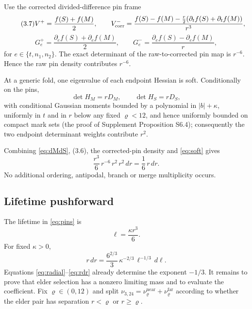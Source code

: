 Use the corrected divided-difference pin frame
\begin{equation}\tag{3.7}
V^+=\frac{f(S)+f(M)}2,\qquad V^-_{\rm corr}=\frac{f(S)-f(M)-\frac r2(\partial_tf(S)+\partial_tf(M))}{r^3},
\end{equation}
\begin{equation}\tag{3.8}
G_e^+=\frac{\partial_ef(S)+\partial_ef(M)}2,\qquad G_e^-=\frac{\partial_ef(S)-\partial_ef(M)}r,
\end{equation}
for $e\in\{t,n_1,n_2\}$. The exact determinant of the raw-to-corrected pin map is $r^{-6}$. Hence the raw pin density contributes $r^{-6}$.

At a generic fold, one eigenvalue of each endpoint Hessian is soft. Conditionally on the pins,
\begin{equation}\tag{3.9}\label{eq:soft}
\det H_M=rD_M,\qquad \det H_S=rD_S,
\end{equation}
with conditional Gaussian moments bounded by a polynomial in $|b|+\kappa$, uniformly in $t$ and in $r$ below any fixed $\varrho<12$, and hence uniformly bounded on compact mark sets (the proof of Supplement Proposition S6.4); consequently the two endpoint determinant weights contribute $r^2$.

Combining \eqref{eq:dMdS}, (3.6), the corrected-pin density and \eqref{eq:soft} gives
\begin{equation}\tag{3.10}\label{eq:radial}
\frac{r^3}{6}\,r^{-6}\,r^2\,r^2\,dr=\frac16\,r\,dr .
\end{equation}
No additional ordering, antipodal, branch or merge multiplicity occurs.

\subsection{Lifetime pushforward}\label{ssec:pushforward}

The lifetime in \eqref{eq:pins} is
\begin{equation}\tag{3.11}
\ell=\frac{\kappa r^3}{6}.
\end{equation}
For fixed $\kappa>0$,
\begin{equation}\tag{3.12}\label{eq:rdr}
r\,dr=\frac{6^{2/3}}{3}\,\kappa^{-2/3}\,\ell^{-1/3}\,d\ell .
\end{equation}
Equations \eqref{eq:radial}--\eqref{eq:rdr} already determine the exponent $-1/3$. It remains to prove that elder selection has a nonzero limiting mass and to evaluate the coefficient. Fix $\varrho\in(0,12)$ and split $\nu_{3,24}=\nu^{\mathrm{near}}_\varrho+\nu^{\mathrm{far}}_\varrho$ according to whether the elder pair has separation $r<\varrho$ or $r\ge\varrho$.

